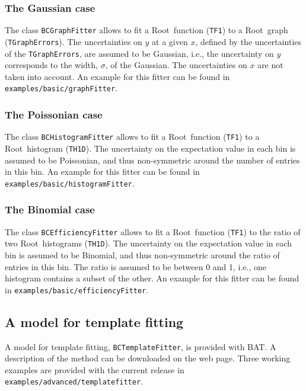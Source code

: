 \documentclass[11pt, a4paper]{article}
\newcommand{\Root}{{\sc Root}}
\begin{document}
\subsubsection{The Gaussian case}
\label{BCGraphFitter}

The class \verb|BCGraphFitter| allows to fit a \Root\ function
(\verb|TF1|) to a \Root\ graph (\verb|TGraphErrors|). The
uncertainties on $y$ at a given $x$, defined by the uncertainties of
the \verb|TGraphErrors|, are assumed to be Gaussian, i.e., the
uncertainty on $y$ corresponds to the width, $\sigma$, of the
Gaussian. The uncertainties on $x$ are not taken into account.  An
example for this fitter can be found in
\verb|examples/basic/graphFitter|.


\subsubsection{The Poissonian case}

The class \verb|BCHistogramFitter| allows to fit a \Root\ function
(\verb|TF1|) to a \Root\ histogram (\verb|TH1D|). The uncertainty on
the expectation value in each bin is assumed to be Poissonian, and
thus non-symmetric around the number of entries in this bin.  An
example for this fitter can be found in
\verb|examples/basic/histogramFitter|.


\subsubsection{The Binomial case}

The class \verb|BCEfficiencyFitter| allows to fit a \Root\ function
(\verb|TF1|) to the ratio of two \Root\ histograms (\verb|TH1D|). The
uncertainty on the expectation value in each bin is assumed to be
Binomial, and thus non-symmetric around the ratio of entries in this
bin. The ratio is assumed to be between 0 and 1, i.e., one histogram
contains a subset of the other.  An example for this fitter can be
found in \verb|examples/basic/efficiencyFitter|.

\enlargethispage{1cm}

\subsection{A model for template fitting}

A model for template fitting, \verb|BCTemplateFitter|, is provided
with BAT. A description of the method can be downloaded on the web
page. Three working examples are provided with the current release in
\verb|examples/advanced/templatefitter|.
\end{document}
